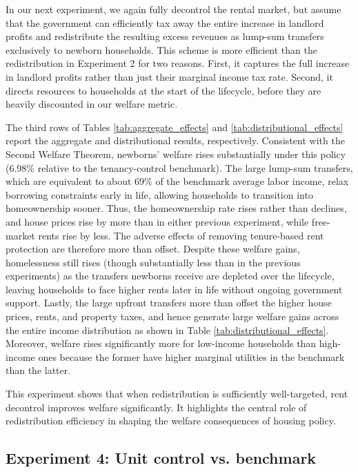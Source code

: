 \documentclass[parskip=full]{article}
\begin{document}
In our next experiment, we again fully decontrol the rental market, but assume that the government can efficiently tax away the entire increase in landlord profits and redistribute the resulting excess revenues as lump-sum transfers exclusively to newborn households. This scheme is more efficient than the redistribution in Experiment 2 for two reasons. First, it captures the full increase in landlord profits rather than just their marginal income tax rate. Second, it directs resources to households at the start of the lifecycle, before they are heavily discounted in our welfare metric. 

The third rows of Tables \ref{tab:aggregate_effects} and \ref{tab:distributional_effects} report the aggregate and distributional results, respectively. Consistent with the Second Welfare Theorem, newborns' welfare rises substantially under this policy (6.98\% relative to the tenancy-control benchmark). The large lump-sum transfers, which are equivalent to about 69\% of the benchmark average labor income, relax borrowing constraints early in life, allowing households to transition into homeownership sooner. Thus, the homeownership rate rises rather than declines, and house prices rise by more than in either previous experiment, while free-market rents rise by less. The adverse effects of removing tenure-based rent protection are therefore more than offset. Despite these welfare gains, homelessness still rises (though substantially less than in the previous experiments) as the transfers newborns receive are depleted over the lifecycle, leaving households to face higher rents later in life without ongoing government support. Lastly, the large upfront transfers more than offset the higher house prices, rents, and property taxes, and hence generate large welfare gains across the entire income distribution as shown in Table \ref{tab:distributional_effects}. Moreover, welfare rises significantly more for low-income households than high-income ones because the former have higher marginal utilities in the benchmark than the latter.

This experiment shows that when redistribution is sufficiently well-targeted, rent decontrol improves welfare significantly. It highlights the central role of redistribution efficiency in shaping the welfare consequences of housing policy.

\subsection{Experiment 4: Unit control vs. benchmark}\label{sec:exp_4}
\end{document}
